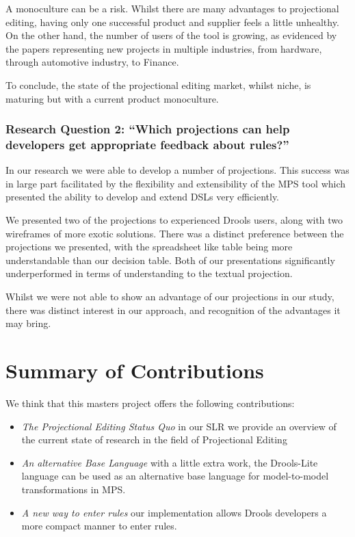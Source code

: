 A monoculture can be a risk.
Whilst there are many advantages to projectional editing, having only one successful product and supplier feels a little unhealthy.
On the other hand, the number of users of the tool is growing, as evidenced by the papers representing new projects in multiple industries, from hardware, through automotive industry, to Finance.

To conclude, the state of the projectional editing market, whilst niche, is maturing but with a current product monoculture.

\subsubsection{Research Question 2: ``Which projections can help developers get appropriate feedback about rules?''}

In our research we were able to develop a number of projections.  
This success was in large part facilitated by the flexibility and extensibility of the MPS tool which presented the ability to develop and extend DSLs very efficiently.

We presented two of the projections to experienced Drools users, along with two wireframes of more exotic solutions.
There was a distinct preference between the projections we presented, with the spreadsheet like table being more understandable than our decision table.
Both of our presentations significantly underperformed in terms of understanding to the textual projection.

Whilst we were not able to show an advantage of our projections in our study, there was distinct interest in our approach, and recognition of the advantages it may bring.

\section{Summary of Contributions}

We think that this masters project offers the following contributions:
\begin{itemize}
    \item \emph{The Projectional Editing Status Quo} in our SLR we provide an overview of the current state of research in the field of Projectional Editing
    \item \emph{An alternative Base Language} with a little extra work, the Drools-Lite language can be used as an alternative base language for model-to-model transformations in MPS.
    \item \emph{A new way to enter rules} our implementation allows Drools developers a more compact manner to enter rules.
\end{itemize}

